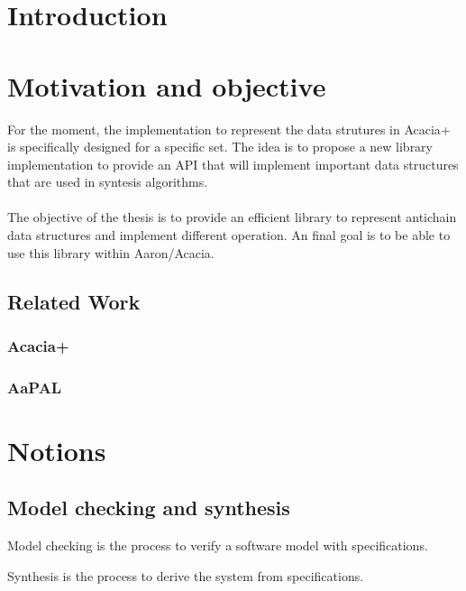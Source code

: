 \documentclass[letterpaper]{article}
\begin{document}
\section{Introduction}


\section{Motivation and objective}

For the moment, the implementation to represent the data strutures in Acacia+
is specifically designed for a specific set. The idea is to propose a new
library implementation to provide an API that will implement important
data structures that are used in syntesis algorithms.

\paragraph{}

The objective of the thesis is to provide an efficient library to represent
antichain data structures and implement different operation. An final
goal is to be able to use this library within Aaron/Acacia.


\subsection{Related Work}

\subsubsection{Acacia+}

\subsubsection{AaPAL}


\section{Notions}

\subsection{Model checking and synthesis}

Model checking is the process to verify a software model with specifications.

Synthesis is the process to derive the system from specifications.
\end{document}
